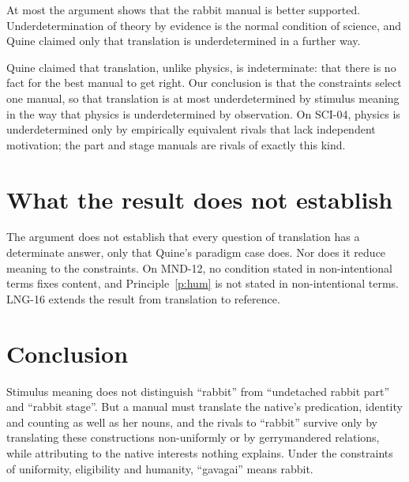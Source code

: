 \documentclass{situationist-preprint}
\begin{document}
\begin{objection}[Underdetermination]
At most the argument shows that the rabbit manual is better supported. Underdetermination of theory by evidence is the normal condition of science, and Quine claimed only that translation is underdetermined in a further way.
\end{objection}

\begin{reply}
Quine claimed that translation, unlike physics, is indeterminate: that there is no fact for the best manual to get right. Our conclusion is that the constraints select one manual, so that translation is at most underdetermined by stimulus meaning in the way that physics is underdetermined by observation. On SCI-04, physics is underdetermined only by empirically equivalent rivals that lack independent motivation; the part and stage manuals are rivals of exactly this kind.
\end{reply}

\section{What the result does not establish}

The argument does not establish that every question of translation has a determinate answer, only that Quine's paradigm case does. Nor does it reduce meaning to the constraints. On MND-12, no condition stated in non-intentional terms fixes content, and Principle~\ref{p:hum} is not stated in non-intentional terms. LNG-16 extends the result from translation to reference.

\section{Conclusion}

Stimulus meaning does not distinguish \enquote{rabbit} from \enquote{undetached rabbit part} and \enquote{rabbit stage}. But a manual must translate the native's predication, identity and counting as well as her nouns, and the rivals to \enquote{rabbit} survive only by translating these constructions non-uniformly or by gerrymandered relations, while attributing to the native interests nothing explains. Under the constraints of uniformity, eligibility and humanity, \enquote{gavagai} means rabbit.
\end{document}
